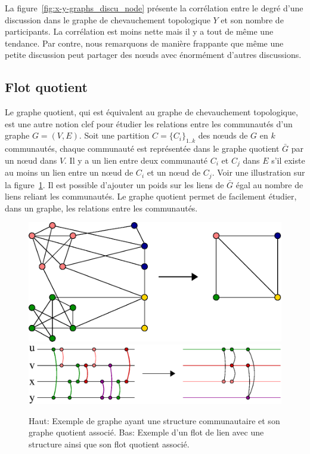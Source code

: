 La figure~\ref{fig:x-y-graphs_discu_node}  présente la corrélation entre le degré d'une discussion dans le graphe de chevauchement topologique $Y$ et son nombre de participants.
La corrélation est moins nette mais il y a tout de même une tendance.
Par contre, nous remarquons de manière frappante que même une petite discussion peut partager des n\oe{}uds avec énormément d'autres discussions.


\subsection{Flot quotient}


Le graphe quotient, qui est équivalent au graphe de chevauchement topologique, est une autre notion clef pour étudier les relations entre les communautés d'un graphe $G=(V,E)$.
Soit une partition $C= \{C_i\}_{1 .. k}$ des n\oe{}uds de $G$ en $k$ communautés, chaque communauté est représentée dans le graphe quotient $\bar{G}$ par un n\oe{}ud dans $V$.
Il y a un lien entre deux communauté $C_i$ et $C_j$ dans $E$ s'il existe au moins un lien entre un n\oe{}ud de $C_i$ et un n\oe{}ud de $C_j$.
Voir une illustration sur la figure~\ref{fig:graph-quotient}.
Il est possible d'ajouter un poids sur les liens de $\bar{G}$ égal au nombre de liens reliant les communautés.
Le graphe quotient permet de facilement étudier, dans un graphe, les relations entre les communautés.

\begin{figure}
\centering
	\includegraphics[width=0.50\linewidth]{img/mailing/graph-quotient}
	\vfill
	\includegraphics[width=0.75\linewidth]{img/mailing/stream-quotient}
	\caption{Haut: Exemple de graphe ayant une structure communautaire et son graphe quotient associé. Bas: Exemple d'un flot de lien avec une structure ainsi que son flot quotient associé.}
	\label{fig:graph-quotient}
\end{figure}

